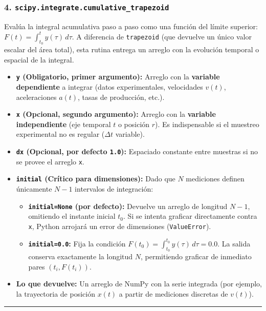 \documentclass[12pt]{article}
\begin{document}
\begin{cajaflex}
\subsubsection*{\textcolor{teal!70!black}{4. \texttt{scipy.integrate.cumulative\_trapezoid} }}
Evalúa la integral acumulativa paso a paso como una función del límite superior: $F(t) = \int_{t_0}^t y(\tau)\,d\tau$. A diferencia de \texttt{trapezoid} (que devuelve un único valor escalar del área total), esta rutina entrega un arreglo con la evolución temporal o espacial de la integral.
\begin{itemize}
    \item \textbf{\texttt{y} (Obligatorio, primer argumento):} Arreglo con la \textbf{variable dependiente} a integrar (datos experimentales, velocidades $v(t)$, aceleraciones $a(t)$, tasas de producción, etc.).
    \item \textbf{\texttt{x} (Opcional, segundo argumento):} Arreglo con la \textbf{variable independiente} (eje temporal $t$ o posición $r$). Es indispensable si el muestreo experimental no es regular ($\Delta t$ variable).
    \item \textbf{\texttt{dx} (Opcional, por defecto \texttt{1.0}):} Espaciado constante entre muestras si no se provee el arreglo \texttt{x}.
    \item \textbf{\texttt{initial} (Crítico para dimensiones):} 
    Dado que $N$ mediciones definen únicamente $N-1$ intervalos de integración:
    \begin{itemize}
        \item \textbf{\texttt{initial=None} (por defecto):} Devuelve un arreglo de longitud $N - 1$, omitiendo el instante inicial $t_0$. Si se intenta graficar directamente contra \texttt{x}, Python arrojará un error de dimensiones (\texttt{ValueError}).
        \item \textbf{\texttt{initial=0.0}:} Fija la condición $F(t_0) = \int_{t_0}^{t_0} y(\tau)\,d\tau = 0.0$. La salida conserva exactamente la longitud $N$, permitiendo graficar de inmediato pares $(t_i, F(t_i))$.
    \end{itemize}
    \item \textbf{Lo que devuelve:} Un arreglo de NumPy con la serie integrada (por ejemplo, la trayectoria de posición $x(t)$ a partir de mediciones discretas de $v(t)$).
\end{itemize}

\textcolor{teal!60!black}{\rule{\linewidth}{0.8pt}}


\end{cajaflex}
\end{document}
